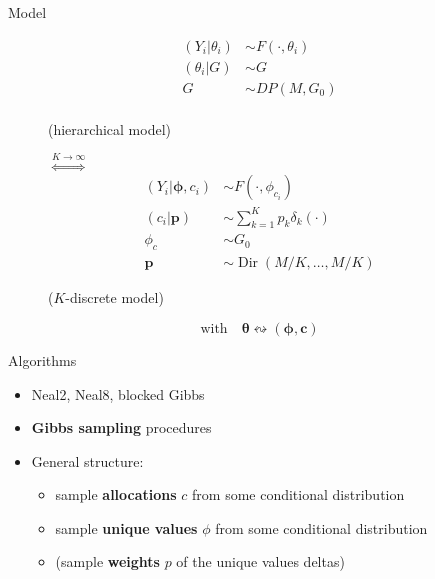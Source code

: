 
\begin{frame}{Model}
\begin{figure}[htpb] 
	\begin{align*}
	(Y_{i}|\theta_{i})&\sim F(\cdot,\theta_i) \\
	(\theta_{i}|G)&\sim G \\
	G & \sim DP(M,G_{0}) \\
	\end{align*}
	\begin{center}
		(hierarchical model)
	\end{center}
	\endminipage 
	$\stackrel{K\to\infty}{\iff}$
	\endminipage
	\begin{align*}
	(Y_{i}|\mathbf{\phi},c_{i})&\sim F(\cdot,\phi_{c_{i}}) \\
	(c_{i}|\mathit{\mathbf{p}})&\sim \sum_{k=1}^K\mathit{p_k} \delta_k(\cdot) \\
	\phi_{c} & \sim G_{0} \\
	\mathbf{p} &\sim \operatorname{Dir}(M/K,\dots,M/K)
	\end{align*}
	\begin{center}
		($K$-discrete model)
	\end{center}
	\endminipage  
\end{figure}
\begin{center}
	$$\text{with} \quad \boldsymbol\theta \leftrightsquigarrow (\boldsymbol\phi, \mathbf c)$$
\end{center}
\end{frame}


\begin{frame}{Algorithms}
	\begin{itemize}
		\item Neal2, Neal8, blocked Gibbs
		\item \textbf{Gibbs sampling} procedures
		\item General structure:
		\begin{itemize}
			\item sample \textbf{allocations} $c$ from some conditional distribution
			\item sample \textbf{unique values} $\phi$ from some conditional distribution
			\item (sample \textbf{weights} $p$ of the unique values deltas)
		\end{itemize}
	\end{itemize}
\end{frame}






